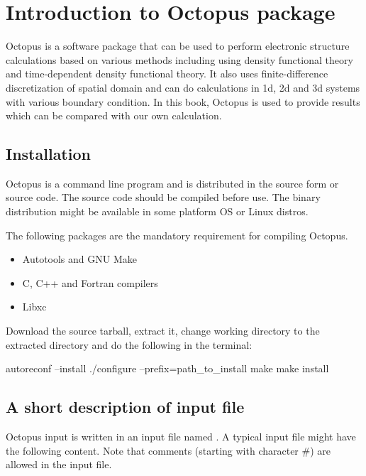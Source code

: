 \chapter{Introduction to \textsf{Octopus} package}

\textsf{Octopus} is a software package that can be used to perform electronic
structure calculations based on various methods including using density functional theory and
time-dependent density functional theory. It also uses finite-difference discretization
of spatial domain and can do calculations in 1d, 2d and 3d systems with various
boundary condition. In this book, \textsf{Octopus} is used to provide results which can
be compared with our own calculation.

\section{Installation}

Octopus is a command line program and is distributed in the source form or source code.
The source code should be compiled before use. The binary distribution might be available in
some platform OS or Linux distros.

The following packages are the mandatory requirement for compiling \textsf{Octopus}.
\begin{itemize}
\item Autotools and GNU Make
\item C, C++ and Fortran compilers
\item Libxc
\end{itemize}

Download the source tarball, extract it, change working directory to the extracted
directory and do the following in the terminal:
\begin{bashcode}
autoreconf --install
./configure --prefix=path_to_install
make
make install
\end{bashcode}



\section{A short description of input file}

Octopus input is written in an input file named . A typical
input file might have the following content. Note that comments (starting with character
\#) are allowed in the input file.


